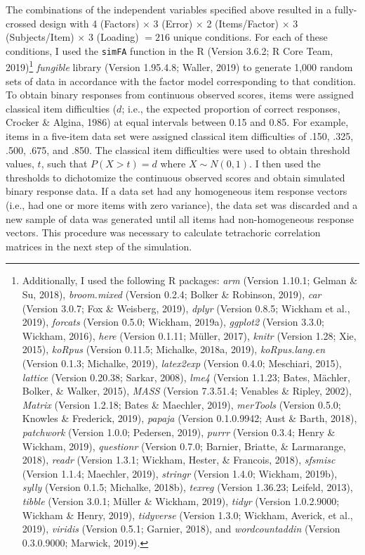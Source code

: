 \documentclass[
  english,
  man]{apa6}
\begin{document}
The combinations of the independent variables specified above resulted in a fully-crossed design with 4 (Factors) \(\times\) 3 (Error) \(\times\) 2 (Items/Factor) \(\times\) 3 (Subjects/Item) \(\times\) 3 (Loading) \(= 216\) unique conditions. For each of these conditions, I used the \texttt{simFA} function in the R (Version 3.6.2; R Core Team, 2019)\footnote{Additionally, I used the following R packages: \emph{arm} (Version 1.10.1; Gelman \& Su, 2018), \emph{broom.mixed} (Version 0.2.4; Bolker \& Robinson, 2019), \emph{car} (Version 3.0.7; Fox \& Weisberg, 2019), \emph{dplyr} (Version 0.8.5; Wickham et al., 2019), \emph{forcats} (Version 0.5.0; Wickham, 2019a), \emph{ggplot2} (Version 3.3.0; Wickham, 2016), \emph{here} (Version 0.1.11; Müller, 2017), \emph{knitr} (Version 1.28; Xie, 2015), \emph{koRpus} (Version 0.11.5; Michalke, 2018a, 2019), \emph{koRpus.lang.en} (Version 0.1.3; Michalke, 2019), \emph{latex2exp} (Version 0.4.0; Meschiari, 2015), \emph{lattice} (Version 0.20.38; Sarkar, 2008), \emph{lme4} (Version 1.1.23; Bates, Mächler, Bolker, \& Walker, 2015), \emph{MASS} (Version 7.3.51.4; Venables \& Ripley, 2002), \emph{Matrix} (Version 1.2.18; Bates \& Maechler, 2019), \emph{merTools} (Version 0.5.0; Knowles \& Frederick, 2019), \emph{papaja} (Version 0.1.0.9942; Aust \& Barth, 2018), \emph{patchwork} (Version 1.0.0; Pedersen, 2019), \emph{purrr} (Version 0.3.4; Henry \& Wickham, 2019), \emph{questionr} (Version 0.7.0; Barnier, Briatte, \& Larmarange, 2018), \emph{readr} (Version 1.3.1; Wickham, Hester, \& Francois, 2018), \emph{sfsmisc} (Version 1.1.4; Maechler, 2019), \emph{stringr} (Version 1.4.0; Wickham, 2019b), \emph{sylly} (Version 0.1.5; Michalke, 2018b), \emph{texreg} (Version 1.36.23; Leifeld, 2013), \emph{tibble} (Version 3.0.1; Müller \& Wickham, 2019), \emph{tidyr} (Version 1.0.2.9000; Wickham \& Henry, 2019), \emph{tidyverse} (Version 1.3.0; Wickham, Averick, et al., 2019), \emph{viridis} (Version 0.5.1; Garnier, 2018), and \emph{wordcountaddin} (Version 0.3.0.9000; Marwick, 2019).} \emph{fungible} library (Version 1.95.4.8; Waller, 2019) to generate 1,000 random sets of data in accordance with the factor model corresponding to that condition. To obtain binary responses from continuous observed scores, items were assigned classical item difficulties (\(d\); i.e., the expected proportion of correct responses, Crocker \& Algina, 1986) at equal intervals between 0.15 and 0.85. For example, items in a five-item data set were assigned classical item difficulties of .150, .325, .500, .675, and .850. The classical item difficulties were used to obtain threshold values, \(t\), such that \(P(X > t) = d\) where \(X \sim N(0,1)\). I then used the thresholds to dichotomize the continuous observed scores and obtain simulated binary response data. If a data set had any homogeneous item response vectors (i.e., had one or more items with zero variance), the data set was discarded and a new sample of data was generated until all items had non-homogeneous response vectors. This procedure was necessary to calculate tetrachoric correlation matrices in the next step of the simulation.
\end{document}
